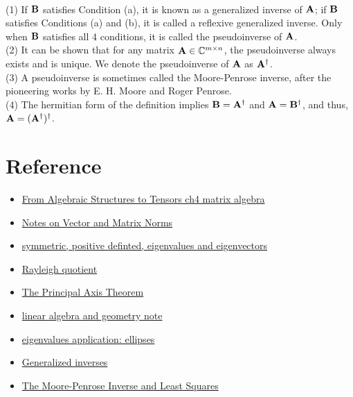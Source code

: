 \begin{remark}
    \\
    (1) If $\bold{B}$ satisfies Condition (a), it is known as a generalized inverse of $\bold{A}$;
    if $\bold{B}$ satisfies Conditions (a) and (b), it is called a reflexive generalized inverse.
    Only when $\bold{B}$ satisfies all 4 conditions, it is called the pseudoinverse of $\bold{A}$.\\
    (2) It can be shown that for any matrix $\bold{A}\in \mathbb{C}^{m\times n}$,
    the pseudoinverse always exists and is unique. We denote the pseudoinverse of $\bold{A}$ as $\bold{A}^{\dagger}$.\\
    (3) A pseudoinverse is sometimes called the Moore-Penrose inverse, after the pioneering works by E. H. Moore and Roger Penrose.\\
    (4) The hermitian form of the definition implies $\bold{B}=\bold{A}^{\dagger}$ and $\bold{A}=\bold{B}^{\dagger}$, and thus, $\bold{A}=(\bold{A}^{\dagger})^{\dagger}$.
\end{remark}



\section{Reference}
\begin{itemize}
    \item \href{}{From Algebraic Structures to Tensors ch4 matrix algebra}
    \item \href{https://www.cs.utexas.edu/users/flame/Notes/NotesOnNorms.pdf}{Notes on Vector and Matrix Norms}
    \item \href{https://ocw.mit.edu/courses/15-084j-nonlinear-programming-spring-2004/resources/lec4_quad_form/}{symmetric, positive definted, eigenvalues and eigenvectors}
    \item \href{https://www.cmor-faculty.rice.edu/~caam440/chapter2.pdf}{Rayleigh quotient}
    \item \href{https://www.math.uwaterloo.ca/~jmckinno/Math225/Week7/Lecture2m.pdf}{The Principal Axis Theorem}
    \item \href{https://staff.polito.it/ada.boralevi/didattica/Dispense_ENG.pdf}{linear algebra and geometry note}
    \item \href{http://jde27.uk/la/36_eigenapplications2.html}{eigenvalues application: ellipses}
    \item \href{https://www.sjsu.edu/faculty/guangliang.chen/Math253S20/lec6ginverse.pdf}{Generalized inverses}
    \item \href{http://buzzard.ups.edu/courses/2014spring/420projects/math420-UPS-spring-2014-macausland-pseudo-inverse.pdf}{The Moore-Penrose Inverse and
    Least Squares}
    
\end{itemize}
